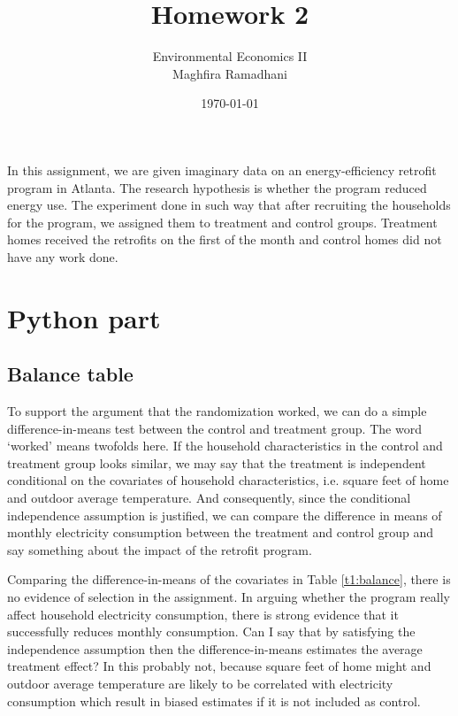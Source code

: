 \documentclass{article}
\begin{document}
 
\title{Homework 2}
\author{Environmental Economics II\\
Maghfira Ramadhani}
\date{\today}
\maketitle

In this assignment, we are given imaginary data on an energy-efficiency retrofit program in Atlanta. The research hypothesis is whether the program reduced energy use. The experiment done in such way that after recruiting the households for the program, we assigned them to treatment and control groups. Treatment homes received the retrofits on the first of the month and control homes did not have any work done.

\section{Python part}
\subsection{Balance table}

To support the argument that the randomization worked, we can do a simple difference-in-means test between the control and treatment group. The word `worked' means twofolds here. If the household characteristics in the control and treatment group looks similar, we may say that the treatment is independent conditional on the covariates of household characteristics, i.e. square feet of home and outdoor average temperature. And consequently, since the conditional independence assumption is justified, we can compare the difference in means of monthly electricity consumption between the treatment and control group and say something about the impact of the retrofit program. 

Comparing the difference-in-means of the covariates in Table \ref{t1:balance}, there is no evidence of selection in the assignment. In arguing whether the program really affect household electricity consumption, there is strong evidence that it successfully reduces monthly consumption. Can I say that by satisfying the independence assumption then the difference-in-means estimates the average treatment effect? In this  probably not, because square feet of home might and outdoor average temperature are likely to be correlated with electricity consumption which result in biased estimates if it is not included as control.
\end{document}
